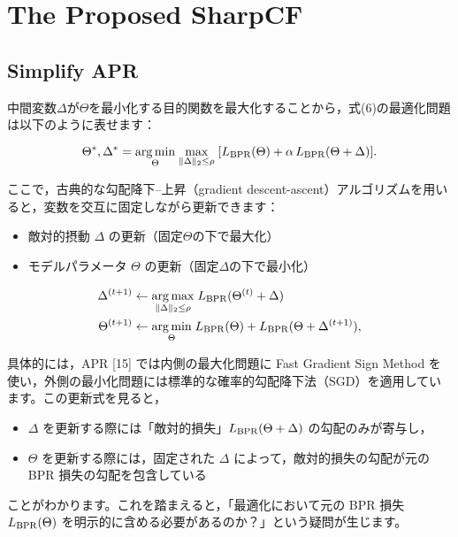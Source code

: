 \documentclass[11pt,a4paper]{article}
\begin{document}
\section{The Proposed SharpCF}

\subsection{Simplify APR}

中間変数$\Delta$が$\Theta$を最小化する目的関数を最大化することから，式(6)の最適化問題は以下のように表せます：

\begin{equation}
\Theta^*, \Delta^* = \underset{\Theta}{\arg\min} \; \underset{\|\Delta\|_2 \le \rho}{\max} \; [L_{\rm BPR}(\Theta) + \alpha \, L_{\rm BPR}(\Theta + \Delta)].
\end{equation}

ここで，古典的な勾配降下–上昇（gradient descent-ascent）アルゴリズムを用いると，変数を交互に固定しながら更新できます：

\begin{itemize}
    \item 敵対的摂動 $\Delta$ の更新（固定$\Theta$の下で最大化）
    \item モデルパラメータ $\Theta$ の更新（固定$\Delta$の下で最小化）
\end{itemize}

\begin{align}
    \Delta^{(t+1)} & \leftarrow \underset{\|\Delta\|_2 \le \rho}{\arg\max}\; L_{\rm BPR}(\Theta^{(t)} + \Delta) \\
    \Theta^{(t+1)} &\leftarrow \underset{\Theta}{\arg\min}\; L_{\rm BPR}(\Theta) + L_{\rm BPR}(\Theta + \Delta^{(t+1)}),
\end{align}

具体的には，APR [15] では内側の最大化問題に Fast Gradient Sign Method を使い，外側の最小化問題には標準的な確率的勾配降下法（SGD）を適用しています。この更新式を見ると，

\begin{itemize}
    \item $\Delta$ を更新する際には「敵対的損失」$L_{\rm BPR}(\Theta + \Delta)$ の勾配のみが寄与し，
    \item $\Theta$ を更新する際には，固定された $\Delta$ によって，敵対的損失の勾配が元の BPR 損失の勾配を包含している
\end{itemize}

ことがわかります。これを踏まえると，「最適化において元の BPR 損失 $L_{\rm BPR}(\Theta)$ を明示的に含める必要があるのか？」という疑問が生じます。
\end{document}
